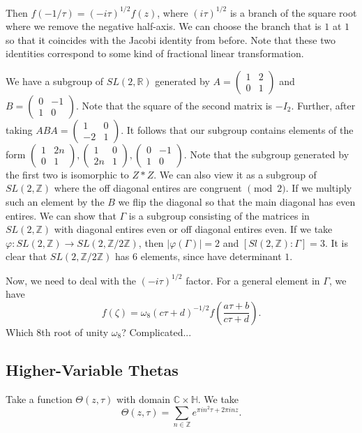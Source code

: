 \documentclass[12pt]{scrartcl}
\newcommand{\Z}{\mathbb{Z}}
\newcommand{\R}{\mathbb{R}}
\newcommand{\C}{\mathbb C}
\let \phi \varphi
\begin{document}
Then $f(-1/\tau) = (-i\tau)^{1/2}f(z)$, where $(i\tau)^{1/2}$ is a branch of the square root where we remove the negative half-axis.  We can choose the branch that is $1$ at $1$ so that it coincides with the Jacobi identity from before. Note that these two identities correspond to some kind of fractional linear transformation.

We have a subgroup of $SL(2, \R)$ generated by $A = \begin{pmatrix}
1 & 2 \\ 0 & 1
\end{pmatrix}$ and $B= \begin{pmatrix} 0 & -1 \\ 1 & 0 \end{pmatrix}$.  Note that the square of the second matrix is $-I_2$.  Further, after taking $ABA = \begin{pmatrix}1 & 0 \\ -2 & 1\end{pmatrix}$.  It follows that our subgroup contains elements of the form
$\begin{pmatrix}
1 & 2n \\ 0 & 1
\end{pmatrix},
\begin{pmatrix}
1 & 0 \\ 2n & 1
\end{pmatrix},
\begin{pmatrix}
0 & -1 \\ 1& 0
\end{pmatrix}$.  Note that the subgroup generated by the first two is isomorphic to $Z * Z$.  We can also view it as a subgroup of $SL(2, \Z)$ where the off diagonal entires are congruent $\pmod 2$.  If we multiply such an element by the  $B$ we flip the diagonal so that the main diagonal has even entires.  We can show that $\Gamma$ is a subgroup consisting of the matrices in $SL(2, \Z)$ with diagonal entires even or off diagonal entires even.  If we take $\phi: SL(2, \Z) \to SL(2, \Z/2\Z)$, then $|\phi(\Gamma)| = 2$ and $[Sl(2, \Z ) : \Gamma] = 3$.  It is clear that $SL(2, \Z/2\Z)$ has $6$ elements, since have determinant $1$.  

Now, we need to deal with the $(-i \tau)^{1/2}$ factor.  For a general element in $\Gamma$, we have 
$$f(\zeta) = \omega_8 (c\tau + d)^{-1/2} f\left( \frac{a\tau + b}{c\tau + d}\right).$$
Which $8$th root of unity $\omega_8$?  Complicated...

\subsection{Higher-Variable Thetas}
Take a function $\Theta(z, \tau)$ with domain $\C \times \mathbb H$.  We take 
$$\Theta(z, \tau) = \sum_{n \in \Z} e^{\pi i n^2 \tau + 2 \pi i n z}.$$
\end{document}
